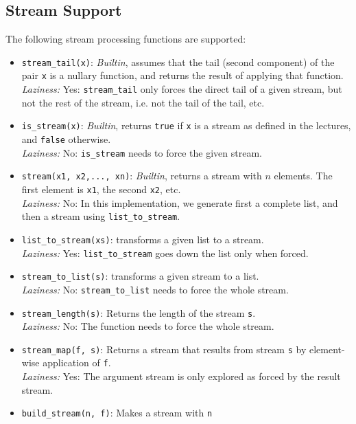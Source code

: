 \subsection*{Stream Support}

The following stream processing functions are supported:

\begin{itemize}
\item \lstinline{stream_tail(x)}: \textit{Builtin}, assumes that the tail (second component) of the
  pair \lstinline{x} is a nullary function, and returns the result of
  applying that function.\\
\emph{Laziness:}  Yes: \lstinline{stream_tail} only forces the direct tail of a given
stream,
but not the rest of the stream, i.e. not the tail of the tail, etc.
\item \lstinline{is_stream(x)}: \textit{Builtin}, returns \lstinline{true} if
  \lstinline{x} is a stream as defined in the lectures, and
  \lstinline{false} otherwise.\\
\emph{Laziness:}  No: \lstinline{is_stream} needs to force the given stream.
\item \lstinline{stream(x1, x2,..., xn)}: \textit{Builtin}, returns a stream with $n$ elements. The
first element is \lstinline{x1}, the second \lstinline{x2}, etc.\\
\emph{Laziness:}  No: In this implementation, we generate first a
           complete list, and then a stream using \lstinline{list_to_stream}.
\item \lstinline{list_to_stream(xs)}: transforms a given list to a stream.\\
\emph{Laziness:}  Yes: \lstinline{list_to_stream} goes down the list only when forced.
\item \lstinline{stream_to_list(s)}: transforms a given stream to a list.\\
\emph{Laziness:}  No: \lstinline{stream_to_list} needs to force the whole stream.
\item \lstinline{stream_length(s)}: Returns the length of the stream
  \lstinline{s}.\\
\emph{Laziness:}  No: The function needs to force the whole stream.
\item \lstinline{stream_map(f, s)}: Returns a stream that results from stream
  \lstinline{s} by element-wise application of \lstinline{f}.\\
\emph{Laziness:}  Yes: The argument stream is only explored as forced by
           the result stream.
\item \lstinline{build_stream(n, f)}: Makes a stream with \lstinline{n}

\end{itemize}
